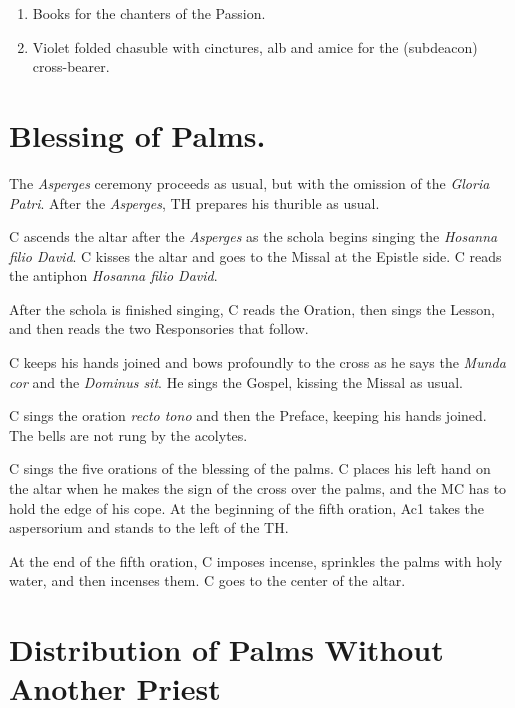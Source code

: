 {\begin{enumerate}[label=\Roman*.]
\begin{enumerate}[label=\arabic*.]
				\item Books for the chanters of the Passion.

				\item Violet folded chasuble with cinctures, alb and amice for
					the (subdeacon) cross-bearer.

			\end{enumerate}

	\end{enumerate}

	\section{Blessing of Palms.}

    \rubric The \textit{Asperges} ceremony proceeds as usual, but with the
    omission of the \textit{Gloria Patri}. After the \textit{Asperges}, TH
    prepares his thurible as usual.

	\rubric C ascends the altar after the \textit{Asperges} as the schola begins
	singing the \textit{Hosanna filio David}. C kisses the altar and goes to
	the Missal at the Epistle side. C reads the antiphon \textit{Hosanna filio
	David}.

    \rubric After the schola is finished singing, C reads the Oration, then
    sings the Lesson, and then reads the two Responsories that follow.

	\rubric C keeps his hands joined and bows profoundly to the cross as he
	says the \textit{Munda cor} and the \textit{Dominus sit}. He sings the
	Gospel, kissing the Missal as usual.

	\rubric C sings the oration \textit{recto tono} and then the Preface,
	keeping his hands joined. The bells are not rung by the acolytes.

	\rubric C sings the five orations of the blessing of the palms. C places
	his left hand on the altar when he makes the sign of the cross over the
	palms, and the MC has to hold the edge of his cope. At the beginning of the
	fifth oration, Ac1 takes the aspersorium and stands to the left of the TH.

	\rubric At the end of the fifth oration, C imposes incense, sprinkles the
	palms with holy water, and then incenses them. C goes to the center of the
	altar.

	\section{Distribution of Palms Without Another Priest}

}
